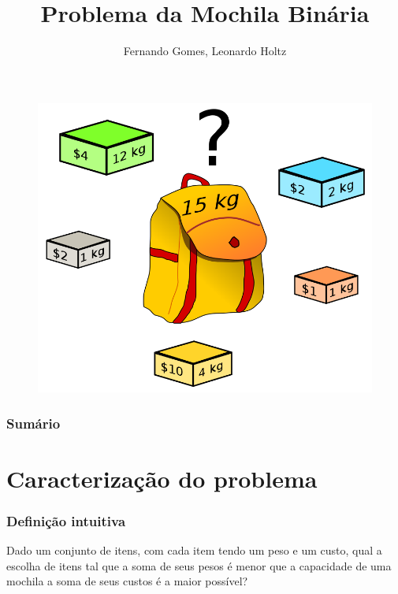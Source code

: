 \documentclass{beamer}
\title{Problema da Mochila Binária}
\author{Fernando Gomes, Leonardo Holtz}
\institute{Universidade Federal do Rio Grande do Sul}
\date{}
\begin{document}
\begin{frame}

\titlepage

\begin{figure}
    \centering
    \includegraphics[scale=0.15]{Knapsack.png}
\end{figure}

\end{frame}

\begin{frame}
\frametitle{Sumário}
\tableofcontents
\end{frame}

\section{Caracterização do problema}

\begin{frame}
\frametitle{Definição intuitiva}

    Dado um conjunto de itens, com cada item tendo um peso
    e um custo, qual a escolha de itens tal que a soma de seus pesos é menor
    que a capacidade de uma mochila a soma de seus custos é a maior possível?

\end{frame}
\end{document}
